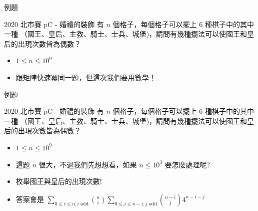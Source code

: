 \documentclass[aspectratio=169]{beamer}
\begin{document}
    \begin{frame}{例題}
        \begin{block}{2020 北市賽 pC - 婚禮的裝飾}
            有 $n$ 個格子，每個格子可以擺上 $6$ 種棋子中的其中一種 （國王、皇后、主教、騎士、士兵、城堡)，請問有幾種擺法可以使國王和皇后的出現次數皆為偶數？
            \begin{itemize}
                \item $1 \le n \le 10^9$
            \end{itemize}
        \end{block}
        \begin{itemize}
            \item 跟矩陣快速冪同一題，但這次我們要用數學！
        \end{itemize}
    \end{frame}
    
    \begin{frame}{例題}
        \begin{block}{2020 北市賽 pC - 婚禮的裝飾}
            有 $n$ 個格子，每個格子可以擺上 $6$ 種棋子中的其中一種 （國王、皇后、主教、騎士、士兵、城堡)，請問有幾種擺法可以使國王和皇后的出現次數皆為偶數？
            \begin{itemize}
                \item $1 \le n \le 10^9$
            \end{itemize}
        \end{block}
        \begin{itemize}
            \item<1-> 這題 $n$ 很大，不過我們先想想看，如果 $n \le 10^3$ 要怎麼處理呢?
            \item<2-> 枚舉國王與皇后的出現次數!
            \item<3-> 答案會是 $\displaystyle \sum_{0 \le i \le n, i \text{ odd}} \binom{n}{i}\sum_{0 \le j \le n-i, j \text{ odd}} \binom{n-i}{j} 4^{n-i-j}$
        \end{itemize}
    \end{frame}
    
\end{document}
